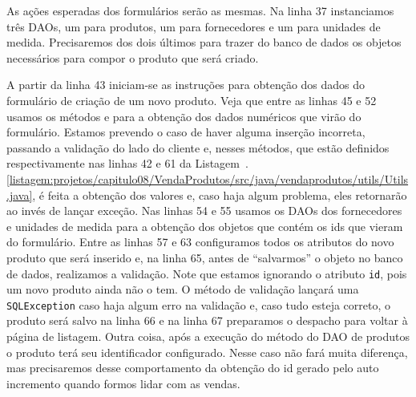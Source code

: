 
As ações esperadas dos formulários serão as mesmas. Na linha 37 instanciamos três DAOs, um para produtos, um para fornecedores e um para unidades de medida. Precisaremos dos dois últimos para trazer do banco de dados os objetos necessários para compor o produto que será criado.

A partir da linha 43 iniciam-se as instruções para obtenção dos dados do formulário de criação de um novo produto. Veja que entre as linhas 45 e 52 usamos os métodos  e  para a obtenção dos dados numéricos que virão do formulário. Estamos prevendo o caso de haver alguma inserção incorreta, passando a validação do lado do cliente e, nesses métodos, que estão definidos respectivamente nas linhas 42 e 61 da Listagem~\thechapter.\ref{listagem:projetos/capitulo08/VendaProdutos/src/java/vendaprodutos/utils/Utils.java}, é feita a obtenção dos valores e, caso haja algum problema, eles retornarão  ao invés de lançar exceção. Nas linhas 54 e 55 usamos os DAOs dos fornecedores e unidades de medida para a obtenção dos objetos que contém os ids que vieram do formulário. Entre as linhas 57 e 63 configuramos todos os atributos do novo produto que será inserido e, na linha 65, antes de ``salvarmos'' o objeto no banco de dados, realizamos a validação. Note que estamos ignorando o atributo \texttt{id}, pois um novo produto ainda não o tem. O método de validação lançará uma \texttt{SQLException} caso haja algum erro na validação e, caso tudo esteja correto, o produto será salvo na linha 66 e na linha 67 preparamos o despacho para voltar à página de listagem. Outra coisa, após a execução do método  do DAO de produtos o produto terá seu identificador configurado. Nesse caso não fará muita diferença, mas precisaremos desse comportamento da obtenção do id gerado pelo auto incremento quando formos lidar com as vendas.

